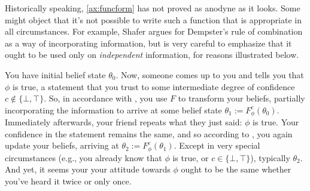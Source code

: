 
Historically speaking, \cref{ax:funcform} has not proved as anodyne as it looks.
Some might object that it's not possible to write such a function that is appropriate in all circumstances.
For example, Shafer argues for Dempster's rule of combination as a way of incorporating information, but is very careful to emphasize that it ought to be used only on \emph{independent} information, for reasons illustrated below.



\begin{example}\label{ex:dupl}
	You have initial belief state $\theta_0$.
	Now, someone comes up to you and tells you that $\phi$ is true, a statement
		that you trust to some intermediate degree of confidence $c \notin\{ \bot, \top\}$.
	So, in accordance with , you use $F$ to transform your beliefs, partially incorporating the information to arrive at some belief state $\theta_1 := F^c_\phi(\theta_0)$.
	Immediately afterwards, your friend repeats what they just said: $\phi$ is true.
	Your confidence in the statement remains the same, and so according to
	, you again update your beliefs, arriving at $\theta_2 := F^c_\phi(\theta_1)$.
	Except in very special circumstances (e.g., you already know that $\phi$ is true, or $c \in \{\bot,\top\}$), typically $\theta_2$.
	And yet, it seems your your attitude towards $\phi$ ought to be the same whether you've heard it twice or only once.
\end{example}


